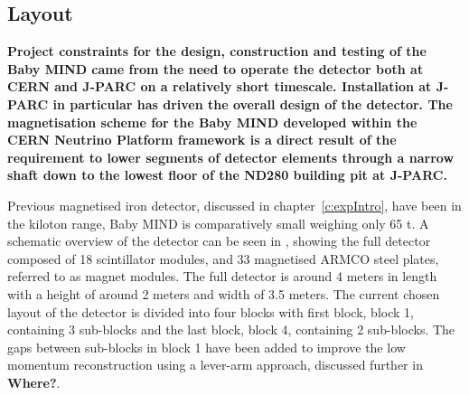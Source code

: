 

\subsection{Layout}
\textbf{Project constraints for the design, construction and testing of the Baby MIND came from the need to operate the detector both at CERN and J-PARC on a relatively short timescale. Installation at J-PARC in particular has driven the overall design of the detector. The magnetisation scheme for the Baby MIND developed within the CERN Neutrino Platform framework is a direct result of the requirement to lower segments of detector elements through a narrow shaft down to the lowest floor of the ND280 building pit at J-PARC. }

Previous magnetised iron detector, discussed in chapter~\ref{c:expIntro}, have been in the kiloton range, Baby MIND is comparatively small weighing only 65 t. A schematic overview of the detector can be seen in , showing the full detector composed of 18 scintillator modules, and 33 magnetised ARMCO steel plates, referred to as magnet modules. The full detector is around 4 meters in length with a height of around 2 meters and width of 3.5 meters. The current chosen layout of the detector is divided into four blocks with first block, block 1, containing 3 sub-blocks and the last block, block 4, containing 2 sub-blocks. The gaps between sub-blocks in block 1 have been added to improve the low momentum reconstruction using a lever-arm approach, discussed further in \textbf{Where?}.


